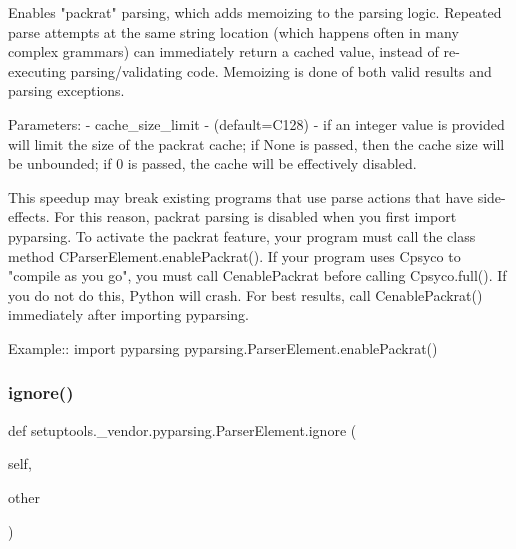 \begin{DoxyVerb}Enables "packrat" parsing, which adds memoizing to the parsing logic.
   Repeated parse attempts at the same string location (which happens
   often in many complex grammars) can immediately return a cached value,
   instead of re-executing parsing/validating code.  Memoizing is done of
   both valid results and parsing exceptions.
   
   Parameters:
    - cache_size_limit - (default=C{128}) - if an integer value is provided
      will limit the size of the packrat cache; if None is passed, then
      the cache size will be unbounded; if 0 is passed, the cache will
      be effectively disabled.
    
   This speedup may break existing programs that use parse actions that
   have side-effects.  For this reason, packrat parsing is disabled when
   you first import pyparsing.  To activate the packrat feature, your
   program must call the class method C{ParserElement.enablePackrat()}.  If
   your program uses C{psyco} to "compile as you go", you must call
   C{enablePackrat} before calling C{psyco.full()}.  If you do not do this,
   Python will crash.  For best results, call C{enablePackrat()} immediately
   after importing pyparsing.
   
   Example::
       import pyparsing
       pyparsing.ParserElement.enablePackrat()
\end{DoxyVerb}
 \mbox{\label{classsetuptools_1_1__vendor_1_1pyparsing_1_1ParserElement_a8312fa721c50e624c6aaeb5b414f6f8b}} 
\subsubsection{\texorpdfstring{ignore()}{ignore()}}
{\footnotesize\ttfamily def setuptools.\+\_\+vendor.\+pyparsing.\+Parser\+Element.\+ignore (\begin{DoxyParamCaption}\item[{}]{self,  }\item[{}]{other }\end{DoxyParamCaption})}

